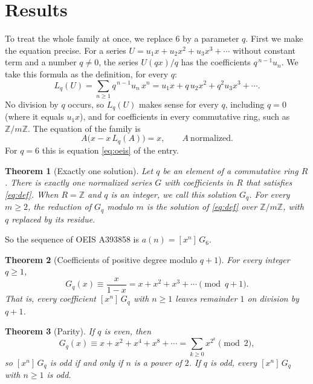 \documentclass[11pt,a4paper]{article}
\newtheorem{theorem}{Theorem}[section]
\theoremstyle{definition}
\theoremstyle{remark}
\newcommand{\Z}{\mathbb{Z}}
\newcommand{\coeff}[2]{[x^{#1}]\,#2}
\begin{document}
\section{Results}\label{sec:results}

To treat the whole family at once, we replace $6$ by a parameter $q$. First we make the equation
precise. For a series $U=u_1x+u_2x^2+u_3x^3+\cdots$ without constant term and a number $q\ne0$, the series $U(qx)/q$
has the coefficients $q^{\,n-1}u_n$. We take this formula as the definition, for every $q$:
\begin{equation}\label{eq:L}
L_q(U)=\sum_{n\ge1}q^{\,n-1}u_n\,x^n=u_1x+q\,u_2x^2+q^2u_3x^3+\cdots .
\end{equation}
No division by $q$ occurs, so $L_q(U)$ makes sense for every $q$, including $q=0$ (where it equals $u_1x$), and for
coefficients in every commutative ring, such as $\Z/m\Z$. The equation of the family is
\begin{equation}\label{eq:def}
A\bigl(x-x\,L_q(A)\bigr)=x,\qquad A\ \text{normalized}.
\end{equation}
For $q=6$ this is equation \eqref{eq:oeis} of the entry.

\begin{theorem}[Exactly one solution]\label{thm:exist}
Let $q$ be an element of a commutative ring $R$. There is exactly one normalized series $G$ with coefficients in $R$
that satisfies \eqref{eq:def}. When $R=\Z$ and $q$ is an integer, we call this solution $G_q$. For every $m\ge2$, the
reduction of $G_q$ modulo $m$ is the solution of \eqref{eq:def} over $\Z/m\Z$, with $q$ replaced by its residue.
\end{theorem}

So the sequence of OEIS A393858 is $a(n)=\coeff{n}{G_{6}}$.

\begin{theorem}[Coefficients of positive degree modulo $q+1$]\label{thm:mod}
For every integer $q\ge1$,
\[
G_q(x)\equiv\frac{x}{1-x}=x+x^2+x^3+\cdots\pmod{q+1}.
\]
That is, every coefficient $\coeff{n}{G_q}$ with $n\ge1$ leaves remainder $1$ on division by $q+1$.
\end{theorem}

\begin{theorem}[Parity]\label{thm:parity}
If $q$ is even, then
\[
G_q(x)\equiv x+x^2+x^4+x^8+\cdots=\sum_{k\ge0}x^{2^k}\pmod 2,
\]
so $\coeff{n}{G_q}$ is odd if and only if $n$ is a power of $2$. If $q$ is odd, every $\coeff{n}{G_q}$ with $n\ge1$
is odd.
\end{theorem}
\end{document}
